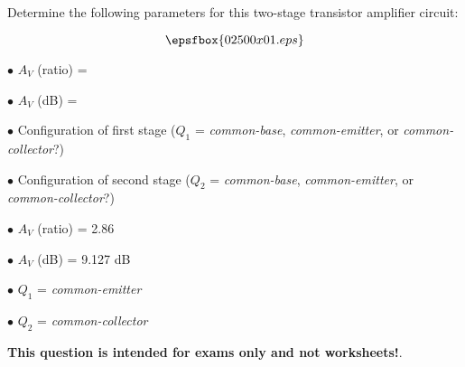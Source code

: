 

Determine the following parameters for this two-stage transistor amplifier circuit:

$$\epsfbox{02500x01.eps}$$

\medskip
\item{$\bullet$} $A_V$ (ratio) = 
\item{$\bullet$} $A_V$ (dB) = 
\item{$\bullet$} Configuration of first stage ($Q_1$ = {\it common-base}, {\it common-emitter}, or {\it common-collector}?)
\item{$\bullet$} Configuration of second stage ($Q_2$ = {\it common-base}, {\it common-emitter}, or {\it common-collector}?)
\medskip







\medskip
\item{$\bullet$} $A_V$ (ratio) = 2.86
\item{$\bullet$} $A_V$ (dB) = 9.127 dB
\item{$\bullet$} $Q_1$ = {\it common-emitter}
\item{$\bullet$} $Q_2$ = {\it common-collector}
\medskip







{\bf This question is intended for exams only and not worksheets!}.





